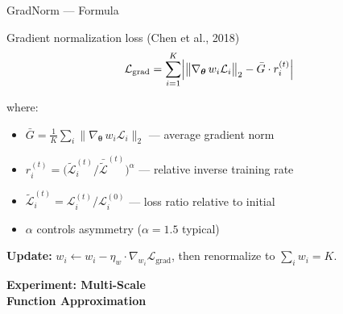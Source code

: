 \documentclass[aspectratio=169,11pt]{beamer}
\begin{document}
\begin{frame}{GradNorm --- Formula}
\begin{block}{Gradient normalization loss (Chen et al., 2018)}
\[
    \mathcal{L}_\text{grad} = \sum_{i=1}^{K} \Bigl| \bigl\| \nabla_{\bm{\theta}}\, w_i \mathcal{L}_i \bigr\|_2 - \bar{G} \cdot r_i^{(t)} \Bigr|
\]
\end{block}

where:
\begin{itemize}
    \item $\bar{G} = \frac{1}{K} \sum_{i} \|\nabla_{\bm{\theta}}\, w_i \mathcal{L}_i\|_2$ --- average gradient norm
    \item $r_i^{(t)} = \bigl(\tilde{\mathcal{L}}_i^{(t)} / \bar{\tilde{\mathcal{L}}}^{(t)}\bigr)^\alpha$ --- relative inverse training rate
    \item $\tilde{\mathcal{L}}_i^{(t)} = \mathcal{L}_i^{(t)} / \mathcal{L}_i^{(0)}$ --- loss ratio relative to initial
    \item $\alpha$ controls asymmetry ($\alpha = 1.5$ typical)
\end{itemize}

\vspace{0.3cm}
\textbf{Update:} $w_i \gets w_i - \eta_w \cdot \nabla_{w_i} \mathcal{L}_\text{grad}$, then renormalize to $\sum_i w_i = K$.
\end{frame}


{
\begin{frame}[plain,c]
\begin{center}
{\Huge\bfseries Experiment: Multi-Scale}\\[0.3cm]
{\Large\bfseries Function Approximation}
\end{center}
\end{frame}
}
\end{document}
